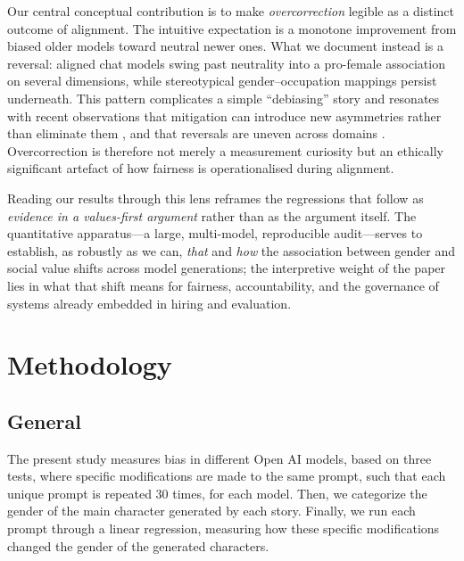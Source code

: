 \documentclass[12pt,a4paper]{article}
\begin{document}
Our central conceptual contribution is to make \emph{overcorrection} legible as a distinct
outcome of alignment. The intuitive expectation is a monotone improvement from biased
older models toward neutral newer ones. What we document instead is a reversal: aligned
chat models swing past neutrality into a pro-female association on several dimensions,
while stereotypical gender--occupation mappings persist underneath. This pattern
complicates a simple ``debiasing'' story and resonates with recent observations that
mitigation can introduce new asymmetries rather than eliminate them
\citep{liu2025, wang2024, mirza2024, karvonen2025}, and that reversals are uneven across
domains \citep{joshi2024}. Overcorrection is therefore not merely a measurement curiosity
but an ethically significant artefact of how fairness is operationalised during alignment.

Reading our results through this lens reframes the regressions that follow as
\emph{evidence in a values-first argument} rather than as the argument itself. The
quantitative apparatus---a large, multi-model, reproducible audit---serves to establish, as
robustly as we can, \emph{that} and \emph{how} the association between gender and social
value shifts across model generations; the interpretive weight of the paper lies in what
that shift means for fairness, accountability, and the governance of systems already
embedded in hiring and evaluation.

\section{Methodology}





\subsection{General}


The present study measures bias in different Open AI models, based
on three tests, where specific modifications are made to the same
prompt, such that each unique prompt is repeated 30 times, for each model.
Then, we categorize the gender of the main character generated by each
story. Finally, we run each prompt through a linear regression,
measuring how these specific modifications changed the gender of the
generated characters.
\end{document}
